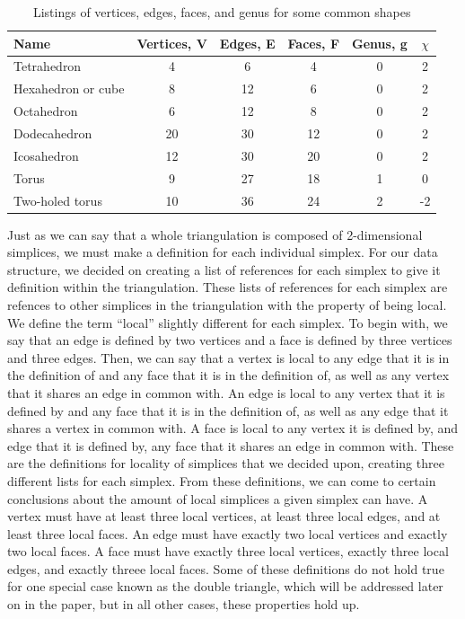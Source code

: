 \documentclass[12pt]{article}
\begin{document}
\begin{table}
\begin{tabular}{lccccc}
Name  &	Vertices, V &	Edges, E & Faces, F &	Genus, g & $\chi$\\
\hline 
Tetrahedron &	4 &	6 &	4 &	0 & 2\\
Hexahedron or cube &	8 &	12 &	6 &	0 &	2\\
Octahedron 	&	6 &	12 &	8 & 0 &	 2\\
Dodecahedron 	&	20 &	30 &	12 &	0&	 2\\
Icosahedron &	12 & 30 & 20 & 0	&	 2\\
Torus & 9 & 27 & 18 &	1 & 0\\
Two-holed torus & 10 & 36 & 24 &	2 & -2\\
\end{tabular}
\caption{Listings of vertices, edges, faces, and genus for some common shapes \cite{wiki}}
\label{EuChar}
\end{table}

\noindent Just as we can say that a whole triangulation is composed of 2-dimensional simplices, we must make a definition for each individual simplex. For our data structure, we decided on creating a list of references for each simplex to give it definition within the triangulation. These lists of references for each simplex are refences to other simplices in the triangulation with the property of being local. We define the term ``local'' slightly different for each simplex. To begin with, we say that an edge is defined by two vertices and a face is defined by three vertices and three edges. Then, we can say that a vertex is local to any edge that it is in the definition of and any face that it is in the definition of, as well as any vertex that it shares an edge in common with. An edge is local to any vertex that it is defined by and any face that it is in the definition of, as well as any edge that it shares a vertex in common with. A face is local to any vertex it is defined by, and edge that it is defined by, any face that it shares an edge in common with. These are the definitions for locality of simplices that we decided upon, creating three different lists for each simplex. From these definitions, we can come to certain conclusions about the amount of local simplices a given simplex can have. A vertex must have at least three local vertices, at least three local edges, and at least three local faces. An edge must have exactly two local vertices and exactly two local faces. A face must have exactly three local vertices, exactly three local edges, and exactly threee local faces. Some of these definitions do not hold true for one special case known as the double triangle, which will be addressed later on in the paper, but in all other cases, these properties hold up.
\end{document}
